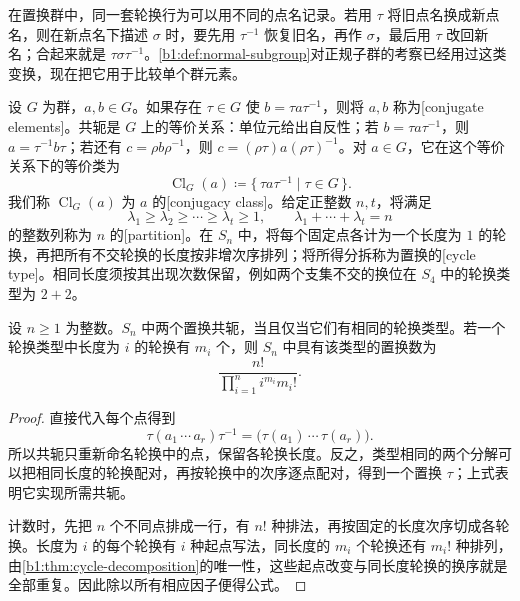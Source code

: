 在置换群中，同一套轮换行为可以用不同的点名记录。若用 \(\tau\) 将旧点名换成新点名，则在新点名下描述 \(\sigma\) 时，要先用 \(\tau^{-1}\) 恢复旧名，再作 \(\sigma\)，最后用 \(\tau\) 改回新名；合起来就是 \(\tau\sigma\tau^{-1}\)。\cref{b1:def:normal-subgroup}对正规子群的考察已经用过这类变换，现在把它用于比较单个群元素。

\begin{definition}\label{b1:def:conjugate-elements}
	设 \(G\) 为群，\(a,b\in G\)。如果存在 \(\tau\in G\) 使 \(b=\tau a\tau^{-1}\)，则将 \(a,b\) 称为[conjugate elements]。共轭是 \(G\) 上的等价关系：单位元给出自反性；若 \(b=\tau a\tau^{-1}\)，则 \(a=\tau^{-1}b\tau\)；若还有 \(c=\rho b\rho^{-1}\)，则 \(c=(\rho\tau)a(\rho\tau)^{-1}\)。对 \(a\in G\)，它在这个等价关系下的等价类为
	\[
		\operatorname{Cl}_G(a)\coloneqq\{\,\tau a\tau^{-1}\mid\tau\in G\,\}.
	\]
	我们称 \(\operatorname{Cl}_G(a)\) 为 \(a\) 的[conjugacy class]。给定正整数 \(n,t\)，将满足
	\[
		\lambda_1\geq\lambda_2\geq\cdots\geq\lambda_t\geq1, \qquad \lambda_1+\cdots+\lambda_t=n
	\]
	的整数列称为 \(n\) 的[partition]。在 \(S_n\) 中，将每个固定点各计为一个长度为 \(1\) 的轮换，再把所有不交轮换的长度按非增次序排列；将所得分拆称为置换的[cycle type]。相同长度须按其出现次数保留，例如两个支集不交的换位在 \(S_4\) 中的轮换类型为 \(2+2\)。
\end{definition}

\begin{proposition}\label{b1:prop:symmetric-conjugacy}
	设 \(n\geq1\) 为整数。\(S_n\) 中两个置换共轭，当且仅当它们有相同的轮换类型。若一个轮换类型中长度为 \(i\) 的轮换有 \(m_i\) 个，则 \(S_n\) 中具有该类型的置换数为
	\[
		\frac{n!}{\prod_{i=1}^n i^{m_i}m_i!}.
	\]
\end{proposition}
\begin{proof}
	直接代入每个点得到
	\begin{equation}\label{b1:eq:cycle-conjugation}
		\tau(a_1\,\cdots\,a_r)\tau^{-1} =\bigl(\tau(a_1)\,\cdots\,\tau(a_r)\bigr).
	\end{equation}
	所以共轭只重新命名轮换中的点，保留各轮换长度。反之，类型相同的两个分解可以把相同长度的轮换配对，再按轮换中的次序逐点配对，得到一个置换 \(\tau\)；上式表明它实现所需共轭。

	计数时，先把 \(n\) 个不同点排成一行，有 \(n!\) 种排法，再按固定的长度次序切成各轮换。长度为 \(i\) 的每个轮换有 \(i\) 种起点写法，同长度的 \(m_i\) 个轮换还有 \(m_i!\) 种排列，由\cref{b1:thm:cycle-decomposition}的唯一性，这些起点改变与同长度轮换的换序就是全部重复。因此除以所有相应因子便得公式。
\end{proof}

